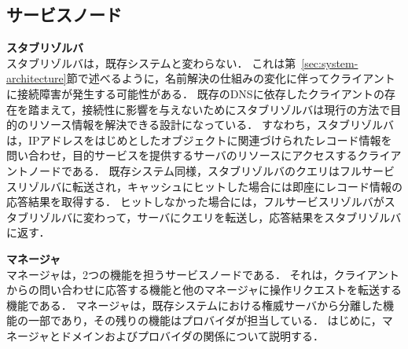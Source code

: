\subsection{サービスノード}
\hspace{-12pt}\textbf{スタブリゾルバ}\\
\label{sec:stab-resolver}
\hspace{12pt}スタブリゾルバは，既存システムと変わらない．
これは第~\ref{sec:system-architecture}節で述べるように，名前解決の仕組みの変化に伴ってクライアントに接続障害が発生する可能性がある．
既存のDNSに依存したクライアントの存在を踏まえて，接続性に影響を与えないためにスタブリゾルバは現行の方法で目的のリソース情報を解決できる設計になっている．
すなわち，スタブリゾルバは，IPアドレスをはじめとしたオブジェクトに関連づけられたレコード情報を問い合わせ，目的サービスを提供するサーバのリソースにアクセスするクライアントノードである．
既存システム同様，スタブリゾルバのクエリはフルサービスリゾルバに転送され，キャッシュにヒットした場合には即座にレコード情報の応答結果を取得する．
ヒットしなかった場合には，フルサービスリゾルバがスタブリゾルバに変わって，サーバにクエリを転送し，応答結果をスタブリゾルバに返す．\newline

\hspace{-12pt}\textbf{マネージャ}\\
\hspace{12pt} マネージャは，2つの機能を担うサービスノードである．
それは，クライアントからの問い合わせに応答する機能と他のマネージャに操作リクエストを転送する機能である．
マネージャは，既存システムにおける権威サーバから分離した機能の一部であり，その残りの機能はプロバイダが担当している．
はじめに，マネージャとドメインおよびプロバイダの関係について説明する．

